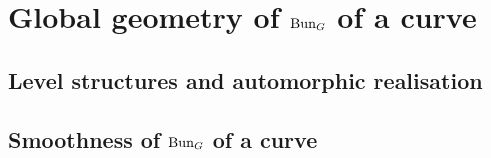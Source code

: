 \section{Global geometry of \texorpdfstring{$\mathrm{Bun}_G$}{} of a curve}
    \subsection{Level structures and automorphic realisation}

    \subsection{Smoothness of \texorpdfstring{$\mathrm{Bun}_G$}{} of a curve}